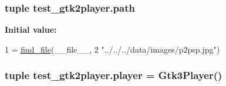 \subsubsection[{path}]{\setlength{\rightskip}{0pt plus 5cm}tuple test\+\_\+gtk2player.\+path}\label{namespacetest__gtk2player_a6d16df350b2dec478016866eb17425d8}
{\bfseries Initial value\+:}
\begin{DoxyCode}
1 = \hyperlink{namespacetest__gtk2player_a1c9b520597497613454be7df393f8c7c}{find\_file}(\_\_file\_\_,
2                                     \textcolor{stringliteral}{"../../../data/images/p2psp.jpg"})
\end{DoxyCode}
\hypertarget{namespacetest__gtk2player_ad1b103d4f47c8574fa227972c380465b}{}
\subsubsection[{player}]{\setlength{\rightskip}{0pt plus 5cm}tuple test\+\_\+gtk2player.\+player = {\bf Gtk3\+Player}()}\label{namespacetest__gtk2player_ad1b103d4f47c8574fa227972c380465b}
